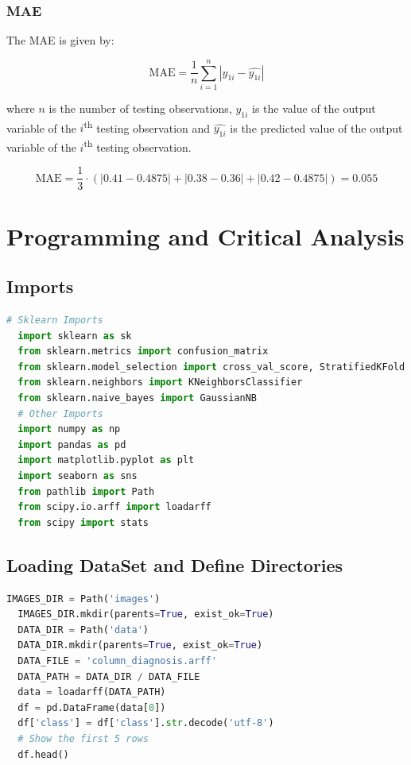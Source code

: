 \documentclass{article}
\begin{document}
\subsubsection*{MAE}

The MAE is given by:

\[ \text{MAE} = \frac{1}{n} \sum_{i=1}^{n} |y_{1i} - \hat{y_{1i}}| \]

where $n$ is the number of testing observations, $y_{1i}$ is the value of the output variable of the $i$\textsuperscript{th} testing observation and $\hat{y_{1i}}$ is the predicted value of the output variable of the $i$\textsuperscript{th} testing observation.

\[ \text{MAE} = \frac{1}{3} \cdot (|0.41 - 0.4875| + |0.38 - 0.36| + |0.42 - 0.4875|) = 0.055 \]

\newpage

\section*{Programming and Critical Analysis}

\subsection*{Imports}
\begin{lstlisting}[language=Python]
  # Sklearn Imports
  import sklearn as sk
  from sklearn.metrics import confusion_matrix
  from sklearn.model_selection import cross_val_score, StratifiedKFold
  from sklearn.neighbors import KNeighborsClassifier
  from sklearn.naive_bayes import GaussianNB
  # Other Imports
  import numpy as np
  import pandas as pd
  import matplotlib.pyplot as plt
  import seaborn as sns
  from pathlib import Path
  from scipy.io.arff import loadarff
  from scipy import stats
\end{lstlisting}

\subsection*{Loading DataSet and Define Directories}

\begin{lstlisting}[language=Python]
  IMAGES_DIR = Path('images')
  IMAGES_DIR.mkdir(parents=True, exist_ok=True)
  DATA_DIR = Path('data')
  DATA_DIR.mkdir(parents=True, exist_ok=True)
  DATA_FILE = 'column_diagnosis.arff'
  DATA_PATH = DATA_DIR / DATA_FILE
  data = loadarff(DATA_PATH)
  df = pd.DataFrame(data[0])
  df['class'] = df['class'].str.decode('utf-8')
  # Show the first 5 rows
  df.head()
  
\end{lstlisting}
\end{document}
